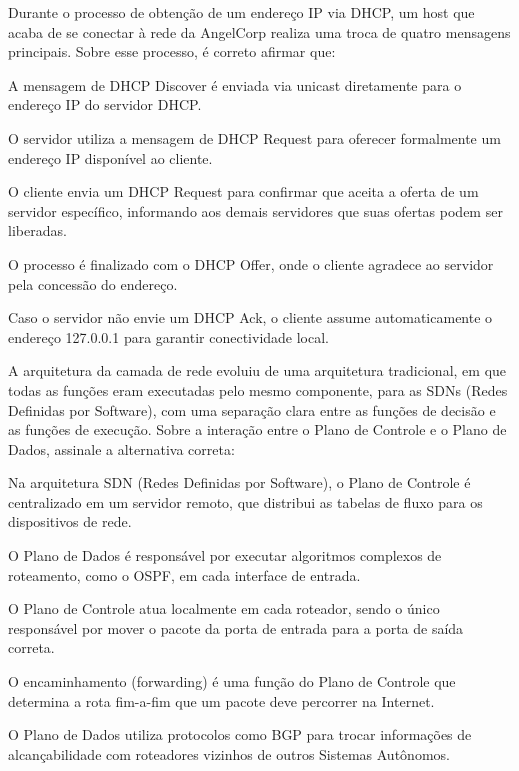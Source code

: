 \documentclass[11pt, addpoints]{modelo/prova2}
\begin{document}
\question[0.5] Durante o processo de obtenção de um endereço IP via DHCP, um host que acaba de se conectar à rede da AngelCorp realiza uma troca de quatro mensagens principais. Sobre esse processo, é correto afirmar que:
    \begin{choices}
        \item A mensagem de DHCP Discover é enviada via unicast diretamente para o endereço IP do servidor DHCP.
        \item O servidor utiliza a mensagem de DHCP Request para oferecer formalmente um endereço IP disponível ao cliente.
        \item O cliente envia um DHCP Request para confirmar que aceita a oferta de um servidor específico, informando aos demais servidores que suas ofertas podem ser liberadas.
        \item O processo é finalizado com o DHCP Offer, onde o cliente agradece ao servidor pela concessão do endereço.
        \item Caso o servidor não envie um DHCP Ack, o cliente assume automaticamente o endereço 127.0.0.1 para garantir conectividade local.
    \end{choices} 
\question[0.5] A arquitetura da camada de rede evoluiu de uma arquitetura tradicional, em que todas as funções eram executadas pelo mesmo componente, para as SDNs (Redes Definidas por Software), com uma separação clara entre as funções de decisão e as funções de execução. Sobre a interação entre o Plano de Controle e o Plano de Dados, assinale a alternativa correta:
    \begin{choices}
        \item Na arquitetura SDN (Redes Definidas por Software), o Plano de Controle é centralizado em um servidor remoto, que distribui as tabelas de fluxo para os dispositivos de rede.
        \item  O Plano de Dados é responsável por executar algoritmos complexos de roteamento, como o OSPF, em cada interface de entrada.
        \item O Plano de Controle atua localmente em cada roteador, sendo o único responsável por mover o pacote da porta de entrada para a porta de saída correta.        
        \item O encaminhamento (forwarding) é uma função do Plano de Controle que determina a rota fim-a-fim que um pacote deve percorrer na Internet.
        \item O Plano de Dados utiliza protocolos como BGP para trocar informações de alcançabilidade com roteadores vizinhos de outros Sistemas Autônomos.
    \end{choices} 
\end{document}
